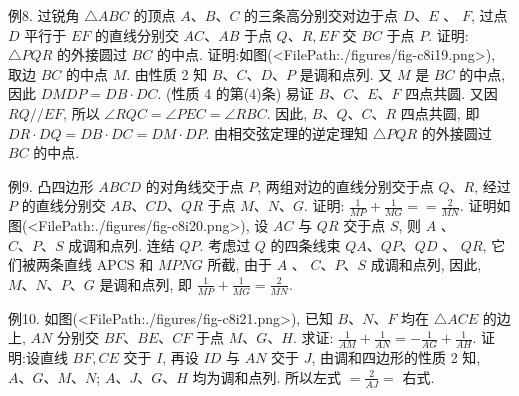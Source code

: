 例8. 过锐角 $\triangle A B C$ 的顶点 $A 、 B 、 C$ 的三条高分别交对边于点 $D 、 E$ 、 $F$, 过点 $D$ 平行于 $E F$ 的直线分别交 $A C 、 A B$ 于点 $Q 、 R, E F$ 交 $B C$ 于点 $P$. 证明: $\triangle P Q R$ 的外接圆过 $B C$ 的中点.
证明:如图(<FilePath:./figures/fig-c8i19.png>), 取边 $B C$ 的中点 $M$.
由性质 2 知 $B 、 C 、 D 、 P$ 是调和点列.
又 $M$ 是 $B C$ 的中点, 因此 $D M D P=D B \cdot D C$. (性质 4 的第(4)条)
易证 $B 、 C 、 E 、 F$ 四点共圆.
又因 $R Q / / E F$, 所以 $\angle R Q C= \angle P E C=\angle R B C$.
因此, $B 、 Q 、 C 、 R$ 四点共圆, 即 $D R \cdot D Q=D B \cdot D C=D M \cdot D P$.
由相交弦定理的逆定理知 $\triangle P Q R$ 的外接圆过 $B C$ 的中点.



例9. 凸四边形 $A B C D$ 的对角线交于点 $P$, 两组对边的直线分别交于点 $Q 、 R$, 经过 $P$ 的直线分别交 $A B 、 C D 、 Q R$ 于点 $M 、 N 、 G$.
证明: $\frac{1}{M P}+\frac{1}{M G}==\frac{2}{M N}$.
证明如图(<FilePath:./figures/fig-c8i20.png>), 设 $A C$ 与 $Q R$ 交于点 $S$, 则 $A$ 、 $C 、 P 、 S$ 成调和点列.
连结 $Q P$. 考虑过 $Q$ 的四条线束 $Q A 、 Q P 、 Q D$ 、 $Q R$, 它们被两条直线 APCS 和 $M P N G$ 所截, 由于 $A$ 、 $C 、 P 、 S$ 成调和点列, 因此, $M 、 N 、 P 、 G$ 是调和点列, 即 $\frac{1}{M P}+\frac{1}{M G}=\frac{2}{M N}$.



例10. 如图(<FilePath:./figures/fig-c8i21.png>), 已知 $B 、 N 、 F$ 均在 $\triangle A C E$ 的边上, $A N$ 分别交 $B F 、 B E 、 C F$ 于点 $M 、 G 、 H$. 求证: $\frac{1}{A M}+\frac{1}{A N}=-\frac{1}{A G}+\frac{1}{A H}$.
证明:设直线 $B F, C E$ 交于 $I$, 再设 $I D$ 与 $A N$ 交于 $J$, 由调和四边形的性质 2 知, $A 、 G 、 M 、 N$; $A 、 J 、 G 、 H$ 均为调和点列.
所以左式 $=\frac{2}{A J}=$ 右式.



